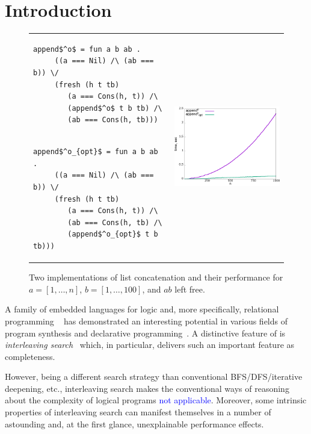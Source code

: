 \section{Introduction}
\label{sec:intro}

\begin{figure}[t]
\begin{tabular}{p{6cm}p{6cm}}
\begin{lstlisting}[basicstyle=\small]
   append$^o$ = fun a b ab .
     ((a === Nil) /\ (ab === b)) \/
     (fresh (h t tb)
        (a === Cons(h, t)) /\
        (append$^o$ t b tb) /\
        (ab === Cons(h, tb)))
\end{lstlisting} & \multirow{2}{*}[-3mm]{\includegraphics[width=6cm,height=5cm]{append_without_oc.png}} \\[-9mm]
\begin{lstlisting}[basicstyle=\small]
   append$^o_{opt}$ = fun a b ab .
     ((a === Nil) /\ (ab === b)) \/
     (fresh (h t tb)
        (a === Cons(h, t)) /\
        (ab === Cons(h, tb) /\
        (append$^o_{opt}$ t b tb)))
\end{lstlisting} &
\end{tabular}
\caption{Two implementations of list concatenation and their performance for $a = [1,\dots,n]$, $b = [1,\dots,100]$, and $ab$ left free.}
\label{fig:length_implementations}
\end{figure}

A family of embedded languages for logic and, more specifically, relational programming \mK~\cite{TRS} has demonstrated an interesting potential in various fields of 
program synthesis and declarative programming~\cite{SevenProblems,Quines,Matching}. A distinctive feature of \mK is \emph{interleaving search}~\cite{Transformers} which,
in particular, delivers such an important feature as completeness.

However, being a different search strategy than conventional BFS/DFS/iterative deepening, etc., interleaving search makes the conventional ways of reasoning about the complexity
of logical programs \textcolor{blue}{not applicable}. Moreover, some intrinsic properties of interleaving search can manifest themselves in a number of astounding and, at the first glance, unexplainable
performance effects. 

